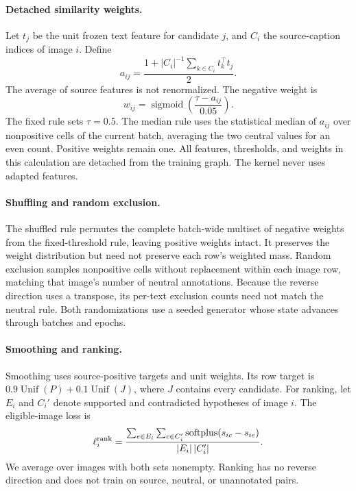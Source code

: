\paragraph{Detached similarity weights.}
Let $t_j$ be the unit frozen text feature for candidate $j$, and $C_i$ the source-caption indices of image $i$. Define
\begin{equation}
a_{ij}=\frac{1+|C_i|^{-1}\sum_{k\in C_i}t_k^\top t_j}{2}.
\end{equation}
The average of source features is not renormalized. The negative weight is
\begin{equation}
w_{ij}=\operatorname{sigmoid}\!\left(\frac{\tau-a_{ij}}{0.05}\right).
\end{equation}
The fixed rule sets $\tau=0.5$. The median rule uses the statistical median of $a_{ij}$ over nonpositive cells of the current batch, averaging the two central values for an even count. Positive weights remain one. All features, thresholds, and weights in this calculation are detached from the training graph. The kernel never uses adapted features.

\paragraph{Shuffling and random exclusion.}
The shuffled rule permutes the complete batch-wide multiset of negative weights from the fixed-threshold rule, leaving positive weights intact. It preserves the weight distribution but need not preserve each row's weighted mass. Random exclusion samples nonpositive cells without replacement within each image row, matching that image's number of neutral annotations. Because the reverse direction uses a transpose, its per-text exclusion counts need not match the neutral rule. Both randomizations use a seeded generator whose state advances through batches and epochs.

\paragraph{Smoothing and ranking.}
Smoothing uses source-positive targets and unit weights. Its row target is $0.9\operatorname{Unif}(P)+0.1\operatorname{Unif}(J)$, where $J$ contains every candidate. For ranking, let $E_i$ and $C_i'$ denote supported and contradicted hypotheses of image $i$. The eligible-image loss is
\begin{equation}
\ell_i^{\rm rank}=\frac{\sum_{e\in E_i}\sum_{c\in C_i'}\operatorname{softplus}(s_{ic}-s_{ie})}{|E_i|\,|C_i'|}.
\end{equation}
We average over images with both sets nonempty. Ranking has no reverse direction and does not train on source, neutral, or unannotated pairs.

